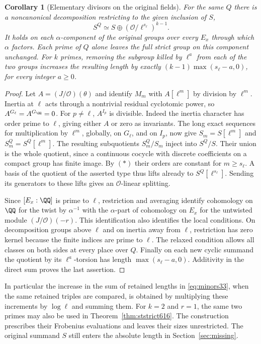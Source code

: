 \documentclass[a4paper,11pt]{article}
\newtheorem{corollary}[proposition]{Corollary}
\theoremstyle{definition}
\theoremstyle{remark}
\numberwithin{equation}{section}
\newcommand{\OO}{\mathcal O}
\begin{document}
\begin{corollary}[Elementary divisors on the original fields]
\label{cor:matchedlength617}
For the same \(Q\) there is a noncanonical decomposition restricting
to the given inclusion of \(S\),
\[
                   S^Q\simeq S\oplus(\OO/\ell^{s_\ell})^{k-1}.
\]
It holds on each \(\alpha\)-component of the original groups over
every \(E_x\) through which \(\alpha\) factors. Each prime of \(Q\)
alone leaves the full strict group on this component unchanged.
For \(k\) primes, removing the subgroup killed by \(\ell^a\) from
each of the two groups increases the resulting length by exactly
\((k-1)\max(s_\ell-a,0)\), for every integer \(a\ge0\).
\end{corollary}
\begin{proof}
Let \(A=(J/\OO)(\theta)\) and identify \(M_m\) with \(A[\ell^m]\)
by division by \(\ell^m\). Inertia at \(\ell\) acts through a
nontrivial residual cyclotomic power, so \(A^{G_\ell}=A^{G_\QQ}=0\).
For \(p\ne\ell\), \(A^{I_p}\) is divisible. Indeed the inertia
character has order prime to \(\ell\), giving either \(A\) or zero
as invariants. The long exact sequences for multiplication by
\(\ell^m\), globally, on \(G_\ell\), and on \(I_p\), now give
\(S_m=S[\ell^m]\) and \(S_m^Q=S^Q[\ell^m]\).
The resulting subquotients \(S_m^Q/S_m\) inject into \(S^Q/S\).
Their union is the whole quotient, since a continuous cocycle with
discrete coefficients on a compact group has finite image. By
\((\ast)\) their orders are constant for \(m\ge s_\ell\). A basis
of the quotient of the asserted type thus lifts already to
\(S^Q[\ell^{s_\ell}]\). Sending its generators to these lifts
gives an \(\OO\)-linear splitting.

Since \([E_x:\QQ]\) is prime to \(\ell\), restriction and averaging
identify cohomology on \(\QQ\) for the twist by \(\alpha^{-1}\)
with the \(\alpha\)-part of cohomology on \(E_x\) for the untwisted
module \((J/\OO)(-r)\). This identification also identifies the
local conditions. On decomposition groups above \(\ell\) and on
inertia away from \(\ell\), restriction has zero kernel because the
finite indices are prime to \(\ell\). The relaxed condition allows
all classes on both sides at every place over \(Q\). Finally on each
new cyclic summand the quotient by its \(\ell^a\)-torsion has length
\(\max(s_\ell-a,0)\). Additivity in the direct sum proves the last
assertion.
\end{proof}

In particular the increase in the sum of retained lengths in
\eqref{eq:minors33}, when the same retained triples are compared,
is obtained by multiplying these increments by \(\log\ell\) and
summing them. For \(k=2\) and \(r=1\), the same two primes may also
be used in Theorem~\ref{thm:ststrict616}. The construction prescribes
their Frobenius evaluations and leaves their sizes unrestricted.
The original summand \(S\) still enters the absolute length in
Section~\ref{sec:missing}.
\end{document}
